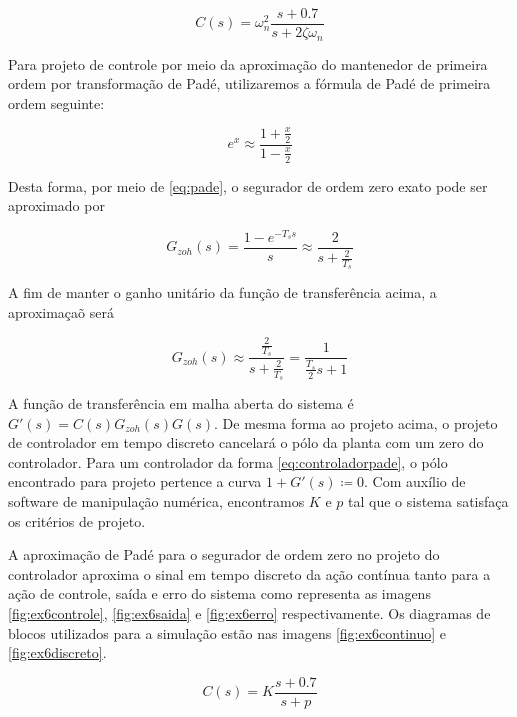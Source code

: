         \begin{equation}
            C(s) = \omega_n^2 \frac{s + 0.7}{s + 2 \zeta \omega_n}
        \end{equation}
        
    Para projeto de controle por meio da aproximação do mantenedor de primeira ordem por transformação de Padé, utilizaremos a fórmula de Padé de primeira ordem seguinte:
    
        \begin{equation}
        e^{x} \approx \frac{1 + \frac{x}{2}}{1 - \frac{x}{2}}
        \label{eq:pade}
        \end{equation}
    
    Desta forma, por meio de \eqref{eq:pade}, o segurador de ordem zero exato pode ser aproximado por
    
        \begin{equation}
        G_{zoh}(s) = \frac{1 - e^{-T_s s}}{s} \approx \frac{2}{ s + \frac{2}{T_s}}
        \end{equation}
    
    A fim de manter o ganho unitário da função de transferência acima, a aproximaçaõ será 
    
        \begin{equation}
        G_{zoh}(s) \approx \frac{\frac{2}{T_s}}{s + \frac{2}{T_s}} = \frac{1}{\frac{T_s}{2} s + 1} 
        \end{equation}
    
    A função de transferência em malha aberta do sistema é $G'(s) = C(s)G_{zoh}(s)G(s)$. De mesma forma ao projeto acima, o projeto de controlador em tempo discreto cancelará o pólo da planta com um zero do controlador. Para um controlador da forma \eqref{eq:controladorpade}, o pólo encontrado para projeto pertence a curva $1 + G'(s) \coloneqq 0$.   Com auxílio de software de manipulação numérica, encontramos $K$ e $p$ tal que o sistema satisfaça os critérios de  projeto. 
    
    A aproximação de Padé para o segurador de ordem zero no projeto do controlador aproxima o sinal em tempo discreto da ação contínua tanto para a ação de controle, saída e erro do sistema como representa as imagens \ref{fig:ex6controle}, \ref{fig:ex6saida} e \ref{fig:ex6erro}  respectivamente. Os diagramas de blocos utilizados para a simulação estão nas imagens \ref{fig:ex6continuo} e \ref{fig:ex6discreto}.
    
    \begin{equation}
    \label{eq:controladorpade}
        C(s) = K \frac{s + 0.7}{s + p}
    \end{equation}
    
